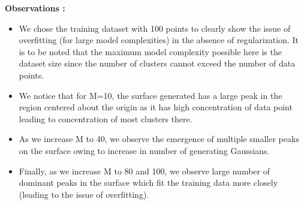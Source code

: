 \documentclass{article}
\begin{document}
\textbf{Observations : \newline}
\begin{itemize}
\item We chose the training dataset with 100 points to clearly show the issue of overfitting (for large model complexities) in the absence of regularization. It is to be noted that the maximum model complexity possible here is the dataset size since the number of clusters cannot exceed the number of data points.
\item We notice that for M=10, the surface generated has a large peak in the region centered about the origin as it has high concentration of data point leading to concentration of most clusters there. 
\item As we increase M to 40, we observe the emergence of multiple smaller peaks on the surface owing to increase in number of generating Gaussians.
\item Finally, as we increase M to 80 and 100, we observe large number of dominant peaks in the surface which fit the training data more closely (leading to the issue of overfitting).
\end{itemize}
\end{document}
